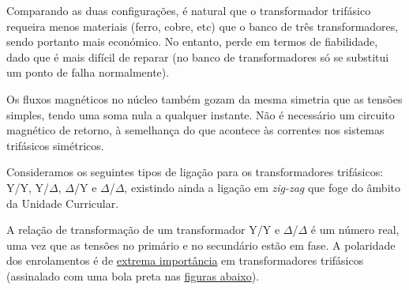 \begin{minipage}[c]{0.525\linewidth}
     Comparando as duas configurações, é natural que o transformador trifásico requeira menos materiais (ferro, cobre, etc) que o banco de três transformadores, sendo portanto mais económico. No entanto, perde em termos de fiabilidade, dado que é mais difícil de reparar (no banco de transformadores só se substitui um ponto de falha normalmente).

     Os fluxos magnéticos no núcleo também gozam da mesma simetria que as tensões simples, tendo uma soma nula a qualquer instante. Não é necessário um circuito magnético de retorno, à semelhança do que acontece às correntes nos sistemas trifásicos simétricos.
\end{minipage}

\vspace{0.75em}
\noindent Consideramos os seguintes tipos de ligação para os transformadores trifásicos: Y/Y, Y/$\Delta$, $\Delta$/Y e $\Delta$/$\Delta$, existindo ainda a ligação em \textit{zig-zag} que foge do âmbito da Unidade Curricular.

A relação de transformação de um transformador Y/Y e $\Delta$/$\Delta$ é um número real, uma vez que as tensões no primário e no secundário estão em fase. A polaridade dos enrolamentos é de \underline{extrema importância} em transformadores trifásicos (assinalado com uma bola preta nas \hyperref[fig:tipos-ligacao-transformador-trifasico]{figuras abaixo}).

